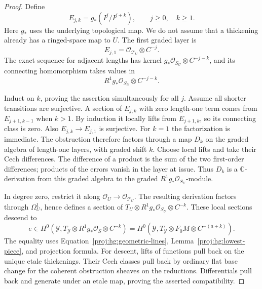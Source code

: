 \documentclass[11pt,letterpaper]{article}
\theoremstyle{definition}
\theoremstyle{remark}
\begin{document}
\begin{proof}
Define
\[
 E_{j,k}=g_*(I^j/I^{j+k}),\qquad j\geq0,\quad k\geq1.
\]
Here \(g_*\) uses the underlying topological map.  We do not
assume that a thickening already has a ringed-space map to \(U\).
The first graded layer is
\[
 E_{j,1}=\mathcal{O}_{\mathcal T_U}\otimes C^{-j}.
\]
The exact sequence for adjacent lengths has kernel
\(g_*\mathcal{O}_{S_U}\otimes C^{-j-k}\), and its connecting homomorphism
takes values in
\[
 R^1g_*\mathcal{O}_{S_U}\otimes C^{-j-k}.
\]

Induct on \(k\), proving the assertion simultaneously for all \(j\).
Assume all shorter transitions are surjective.  A section of
\(E_{j,k}\) with zero length-one term comes from \(E_{j+1,k-1}\)
when \(k>1\).  By induction it locally lifts from \(E_{j+1,k}\),
so its connecting class is zero.  Also \(E_{j,k}\to E_{j,1}\)
is surjective.  For \(k=1\) the factorization is immediate.
The obstruction therefore factors through a map \(D_k\) on the
graded algebra of length-one layers, with graded shift \(k\).
Choose local lifts and take their Cech differences.  The
difference of a product is the sum of the two first-order
differences; products of the errors vanish in the layer at issue.
Thus \(D_k\) is a \(\mathbb{C}\)-derivation from this graded algebra to
the graded \(R^1g_*\mathcal{O}_{S_U}\)-module.

In degree zero, restrict it along
\(\mathcal{O}_U\to\mathcal{O}_{\mathcal T_U}\).  The resulting derivation factors
through \(\Omega_U^1\), hence defines a section of
\(T_U\otimes R^1g_*\mathcal{O}_{S_U}\otimes C^{-k}\).
These local sections descend to
\begin{equation}\label{proj:hg:obstruction-section}
 e\in H^0\!\left(
 \mathcal Y,T_{\mathcal Y}\otimes R^1g_*\mathcal{O}_S\otimes C^{-k}
 \right)
 =
 H^0\!\left(
 \mathcal Y,T_{\mathcal Y}\otimes F_0M\otimes C^{-(a+k)}
 \right).
\end{equation}
The equality uses Equation~\eqref{proj:hg:geometric-lines},
Lemma~\ref{proj:hg:lowest-piece}, and projection formula.
For descent, lifts of functions pull back on the unique etale
thickenings.  Their Cech classes pull back by ordinary flat base
change for the coherent obstruction sheaves on the reductions.
Differentials pull back and generate under an etale map, proving
the asserted compatibility.


\end{proof}
\end{document}
